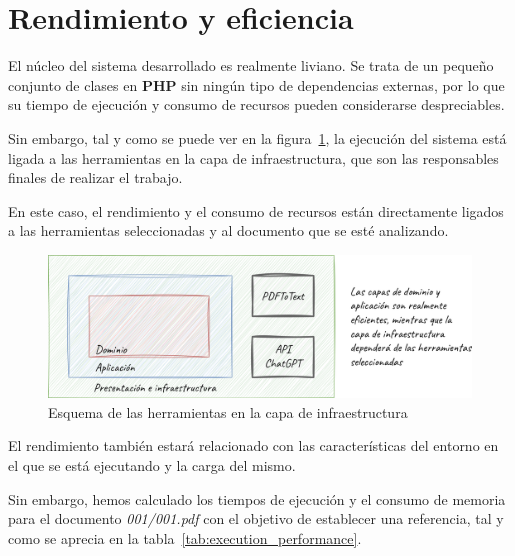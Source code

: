 \section{Rendimiento y eficiencia}

El núcleo del sistema desarrollado es realmente liviano.
Se trata de un pequeño conjunto de clases en \textbf{PHP} sin ningún tipo de dependencias externas, por lo que su
tiempo de ejecución y consumo de recursos pueden considerarse despreciables.

Sin embargo, tal y como se puede ver en la figura~\ref{fig:chapter_5.2.performance}, la ejecución del sistema está
ligada a las herramientas en la capa de infraestructura, que son las responsables finales de realizar el trabajo.

En este caso, el rendimiento y el consumo de recursos están directamente ligados a las herramientas seleccionadas y al
documento que se esté analizando.

\begin{figure}[ht]
    \begin{center}
        \includegraphics[width=\textwidth]{./chapter/5/images/chapter_5.2.performance}
        \caption{Esquema de las herramientas en la capa de infraestructura}
        \label{fig:chapter_5.2.performance}
    \end{center}
\end{figure}

El rendimiento también estará relacionado con las características del entorno en el que se está ejecutando y la
carga del mismo.

Sin embargo, hemos calculado los tiempos de ejecución y el consumo de memoria para el documento \textit{001/001.pdf}
con el objetivo de establecer una referencia, tal y como se aprecia en la tabla~\ref{tab:execution_performance}.

